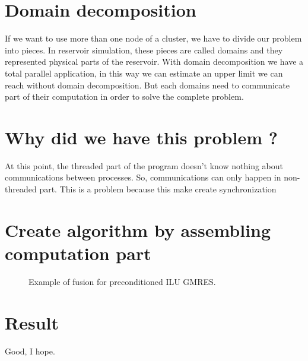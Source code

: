 \section{Domain decomposition}
If we want to use more than one node of a cluster, we have to divide our problem into pieces.
%
In reservoir simulation, these pieces are called domains and they represented physical parts of the reservoir.
%
With domain decomposition we have a total parallel application, in this way we can estimate an upper limit we can reach without domain decomposition.
%
But each domains need to communicate part of their computation in order to solve the complete problem.

\section{Why did we have this problem ?}
At this point, the threaded part of the program doesn't know nothing about communications between processes.
%
So, communications can only happen in non-threaded part.
%
This is a problem because this make create synchronization  

\section{Create algorithm by assembling computation part}

\begin{figure}[!ht]
	\begin{center}
	\end{center}
	\caption{Example of fusion for preconditioned ILU GMRES.}
	\label{fig:fusion}
\end{figure}


\section{Result}
Good, I hope.
